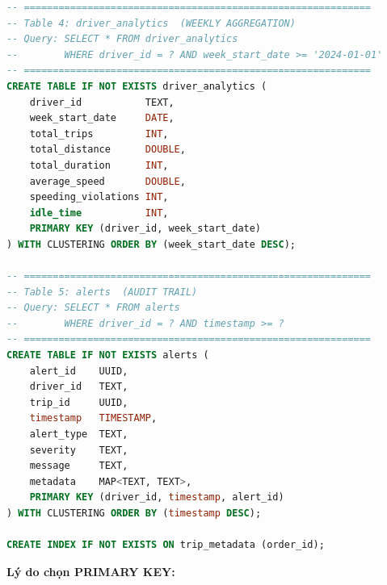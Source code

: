 \begin{lstlisting}[language=SQL, caption={Cassandra Schema — \texttt{init-cql.cql}: Keyspace và 5 bảng chính}, label={lst:cql-schema}]
-- ============================================================
-- Table 4: driver_analytics  (WEEKLY AGGREGATION)
-- Query: SELECT * FROM driver_analytics
--        WHERE driver_id = ? AND week_start_date >= '2024-01-01'
-- ============================================================
CREATE TABLE IF NOT EXISTS driver_analytics (
    driver_id           TEXT,
    week_start_date     DATE,
    total_trips         INT,
    total_distance      DOUBLE,
    total_duration      INT,
    average_speed       DOUBLE,
    speeding_violations INT,
    idle_time           INT,
    PRIMARY KEY (driver_id, week_start_date)
) WITH CLUSTERING ORDER BY (week_start_date DESC);

-- ============================================================
-- Table 5: alerts  (AUDIT TRAIL)
-- Query: SELECT * FROM alerts
--        WHERE driver_id = ? AND timestamp >= ?
-- ============================================================
CREATE TABLE IF NOT EXISTS alerts (
    alert_id    UUID,
    driver_id   TEXT,
    trip_id     UUID,
    timestamp   TIMESTAMP,
    alert_type  TEXT,
    severity    TEXT,
    message     TEXT,
    metadata    MAP<TEXT, TEXT>,
    PRIMARY KEY (driver_id, timestamp, alert_id)
) WITH CLUSTERING ORDER BY (timestamp DESC);

CREATE INDEX IF NOT EXISTS ON trip_metadata (order_id);
\end{lstlisting}

\bigskip
\noindent
\textbf{Lý do chọn PRIMARY KEY:}

